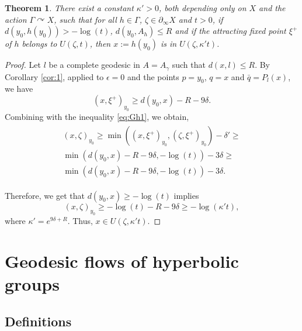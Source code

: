 \documentclass[12pt]{amsbook}%
\newtheorem{thm}{Theorem}[chapter]
\theoremstyle{definition}
\theoremstyle{remark}
\numberwithin{section}{chapter}
\numberwithin{subsection}{section}
\numberwithin{figure}{chapter}
\DeclareMathOperator{\acts}{\curvearrowright}
\def\eps{\epsilon}
\def\Ga{\Gamma}
\def\ga{\gamma}
\def\geo{\partial_\infty}
\def\kap{}
\begin{document}
\begin{thm}\label{thm:redressing3}
There exist %
 a constant $\kappa'>0$, both depending only on $X$ and the action $\Ga\acts X$, such that for all $h\in \Ga$, 
$\zeta\in \geo X$ and $t > 0$, if $d(y_0, h(y_0))> - \log(t)$, $d(y_0, A_h)\le R$ and if the attracting fixed point $\xi^+$ of $h$ belongs to $U(\zeta, t)$, then  
$x:=h(y_0)$ is in $U(\zeta, \kappa' t)$. 
\end{thm}
\begin{proof} %
Let $l$ be a complete geodesic in $A=A_\ga$ such that $d(x, l)\le R$. 
By Corollary \ref{cor:1}, applied to $\eps=0$ and the points $p=y_0$, $q=x$ and 
$\bar{q}=P_l(x)$, we have 
$$
(x,\xi^+)_{y_0}\geqslant d(y_0, x) - R - 9\delta. 
$$
Combining with  the inequality \eqref{eq:Gh1}, we obtain, 
\begin{align}\label{eq:yzeta_estimate}
\begin{split}
(x,\zeta)_{y_0}  \geqslant \min( (x, \xi^+)_{y_0}, (\zeta,\xi^+)_{y_0}) -\delta' \geqslant \\
\min( d(y_0, x) - R - 9\delta, -\log(t))-3\delta\geqslant \\
 \min( d(y_0, x) - R - 9\delta, -\log(t))-3\delta. 
 \end{split}
\end{align}

Therefore, %
we get that $d(y_0, x)\geqslant -\log(t)$ implies 
$$
(x,\zeta)_{y_0}  \geqslant   -\log(t) - R - 9\delta \geqslant  -\log(\kappa' t), 
$$
where $\kappa'= e^{9\delta + R}$.  Thus, $x\in U(\zeta, \kappa' t)$. 
\end{proof}









\section{Geodesic flows of hyperbolic groups}\label{sec:Geodesic flows of hyperbolic groups}



\subsection{Definitions}
\end{document}
